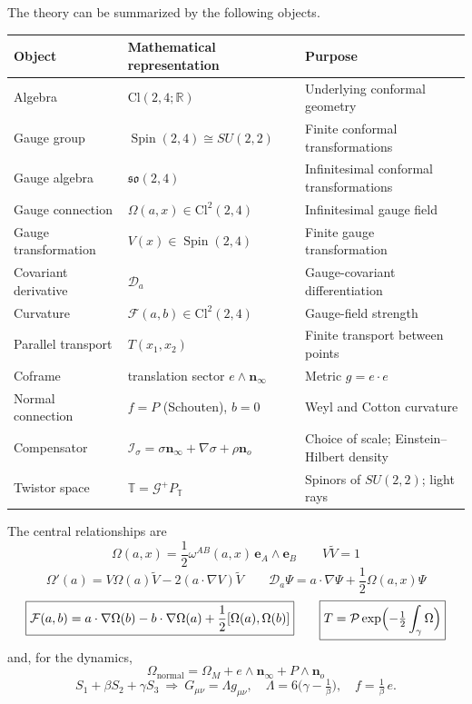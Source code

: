 \documentclass[11pt,a4paper]{article}
\newcommand{\Cl}{\mathrm{Cl}}
\newcommand{\R}{\mathbb{R}}
\newcommand{\T}{\mathbb{T}}
\newcommand{\Spin}{\operatorname{Spin}}
\newcommand{\so}{\mathfrak{so}}
\newcommand{\G}{\mathcal{G}}
\newcommand{\D}{\mathcal{D}}
\newcommand{\F}{\mathcal{F}}
\newcommand{\Om}{\Omega}
\newcommand{\nzero}{\mathbf{n}_o}
\newcommand{\ninf}{\mathbf{n}_\infty}
\newcommand{\e}{\mathbf{e}}
\newcommand{\wedgeprod}{\mathbin{\wedge}}
\newcommand{\rev}[1]{\widetilde{#1}}
\begin{document}
The theory can be summarized by the following objects.

\begin{center}
\renewcommand{\arraystretch}{1.25}
\begin{tabular}{>{\raggedright\arraybackslash}p{}
                >{\centering\arraybackslash}p{}
                >{\raggedright\arraybackslash}p{}}
    \toprule
    Object & Mathematical representation & Purpose\\
    \midrule
    Algebra & \(\Cl(2,4;\R)\) & Underlying conformal geometry\\
    Gauge group & \(\Spin(2,4)\cong SU(2,2)\)
        & Finite conformal transformations\\
    Gauge algebra & \(\so(2,4)\) & Infinitesimal conformal
        transformations\\
    Gauge connection & \(\Om(a,x)\in\Cl^2(2,4)\) & Infinitesimal gauge
        field\\
    Gauge transformation & \(V(x)\in\Spin(2,4)\) & Finite gauge
        transformation\\
    Covariant derivative & \(\D_a\) & Gauge-covariant
        differentiation\\
    Curvature & \(\F(a,b)\in\Cl^2(2,4)\) & Gauge-field strength\\
    Parallel transport & \(T(x_1,x_2)\) & Finite transport between
        points\\
    Coframe & translation sector \(e\wedgeprod\ninf\) & Metric
        \(g=e\cdot e\)\\
    Normal connection & \(f=P\) (Schouten), \(b=0\) & Weyl and Cotton
        curvature\\
    Compensator & \(\mathcal I_\sigma=\sigma\ninf+\nabla\sigma+\rho\nzero\)
        & Choice of scale; Einstein--Hilbert density\\
    Twistor space & \(\T=\G^+P_{\T}\) & Spinors of \(SU(2,2)\); light
        rays\\
    \bottomrule
\end{tabular}
\end{center}

The central relationships are
\[
    \boxed{
        \Om(a,x)
        =
        \frac{1}{2}
        \omega^{AB}(a,x)\,
        \e_A\wedgeprod\e_B
    }
    \qquad
    \boxed{
        V\rev{V}=1
    }
\]
\[
    \boxed{
        \Om'(a)=V\Om(a)\rev V-2(a\cdot\nabla V)\rev V
    }
    \qquad
    \boxed{
        \D_a\Psi
        =
        a\cdot\nabla\Psi
        +
        \frac{1}{2}\Om(a,x)\Psi
    }
\]
\[
    \boxed{
        \F(a,b)
        =
        a\cdot\nabla\Om(b)
        -
        b\cdot\nabla\Om(a)
        +
        \frac{1}{2}[\Om(a),\Om(b)]
    }
    \qquad
    \boxed{
        T=\mathcal P\exp\Bigl(-\tfrac12\int_\gamma\Om\Bigr)
    }
\]
and, for the dynamics,
\[
    \boxed{
        \Om_{\mathrm{normal}}=\Om_M+e\wedgeprod\ninf+P\wedgeprod\nzero
    }
\]
\[
    \boxed{
        S_1+\beta S_2+\gamma S_3
        \ \Longrightarrow\
        G_{\mu\nu}=\Lambda g_{\mu\nu},
        \quad
        \Lambda=6\bigl(\gamma-\tfrac1\beta\bigr),
        \quad
        f=\tfrac1\beta\,e .
    }
\]
\end{document}
